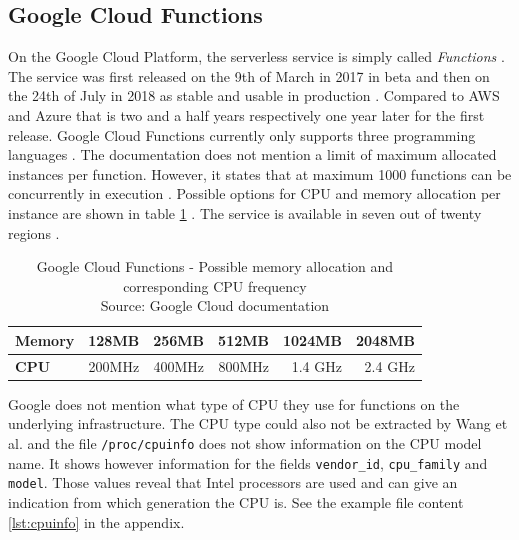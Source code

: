 \subsection{Google Cloud Functions}

On the Google Cloud Platform, the serverless service is simply called \textit{Functions} \cite{GoogleFunctions}. The service was first released on the 9th of March in 2017 in beta and then on the 24th of July in 2018 as stable and usable in production \cite{GoogleFunctionsReleases}. Compared to AWS and Azure that is two and a half years respectively one year later for the first release. Google Cloud Functions currently only supports three programming languages \cite{GoogleFunctionsLanguages}. The documentation does not mention a limit of maximum allocated instances per function. However, it states that at maximum 1000 functions can be concurrently in execution \cite{GoogleFunctionsQuotas}. Possible options for CPU and memory allocation per instance are shown in table \ref{table:google_functions_cpu_ram} \cite{GoogleFunctionsPricing}. The service is available in seven out of twenty regions \cite{GoogleFunctionsLocations}.

\begin{table}[htp]
\centering
\begin{tabular}{|l|r|r|r|r|r|} 
 \hline
	\textbf{Memory} & 128\gls{MB} & 256\gls{MB} & 512\gls{MB} & 1024\gls{MB} & 2048\gls{MB} \\ \hline
	\textbf{CPU} & 200\gls{MHz} & 400\gls{MHz} & 800\gls{MHz} & 1.4 \gls{GHz} & 2.4 \gls{GHz} \\
	\hline
\end{tabular}
\caption[Google Cloud Functions - Possible memory allocation and corresponding CPU frequency]{Google Cloud Functions - Possible memory allocation and corresponding CPU frequency\\Source: Google Cloud documentation \cite{GoogleFunctionsPricing}}
\label{table:google_functions_cpu_ram}
\end{table}

Google does not mention what type of CPU they use for functions on the underlying infrastructure. The CPU type could also not be extracted by Wang et al. \cite{216063} and the file \texttt{/proc/cpuinfo} does not show information on the CPU model name. It shows however information for the fields \texttt{vendor\_id}, \texttt{cpu\_family} and \texttt{model}. Those values reveal that Intel processors are used and can give an indication from which generation the CPU is. See the example file content \ref{lst:cpuinfo} in the appendix. 

